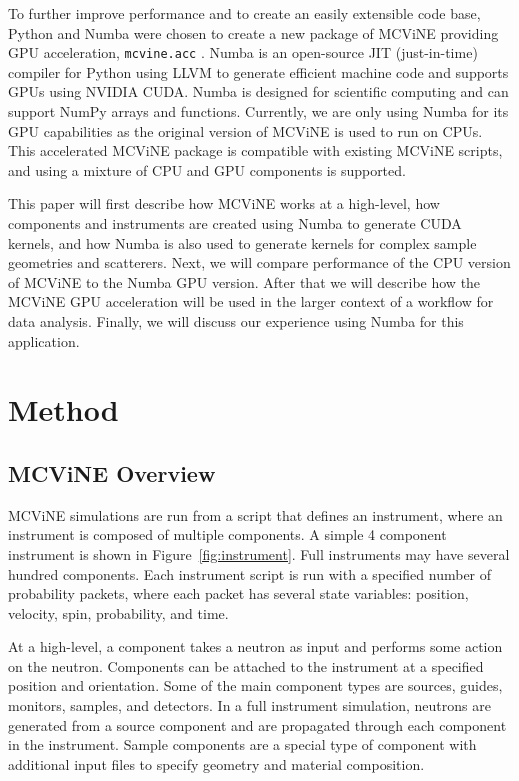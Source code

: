 To further improve performance and to create an easily extensible code base, Python and Numba \cite{lam2015numba} were chosen to create a new package of MCViNE providing GPU acceleration, \texttt{mcvine.acc} \cite{Lin_mcvine_acc}. Numba is an open-source JIT (just-in-time) compiler for Python using LLVM to generate efficient machine code and supports GPUs using NVIDIA CUDA. Numba is designed for scientific computing and can support NumPy arrays and functions. Currently, we are only using Numba for its GPU capabilities as the original version of MCViNE is used to run on CPUs. This accelerated MCViNE package is compatible with existing MCViNE scripts, and using a mixture of CPU and GPU components is supported.

This paper will first describe how MCViNE works at a high-level, how components and instruments are created using Numba to generate CUDA kernels, and how Numba is also used to generate kernels for complex sample geometries and scatterers. 
Next, we will compare performance of the CPU version of MCViNE to the Numba GPU version.
After that we will describe how the MCViNE GPU acceleration will be used in the larger context of a workflow for data analysis. 
Finally, we will discuss our experience using Numba for this application.


\section{Method}

\subsection{MCViNE Overview}

MCViNE simulations are run from a script that defines an instrument, where an instrument is composed of multiple components. A simple 4 component instrument is shown in Figure~\ref{fig:instrument}. Full instruments may have several hundred components. Each instrument script is run with a specified number of probability packets, where each packet has several state variables: position, velocity, spin, probability, and time.

At a high-level, a component takes a neutron as input and performs some action on the neutron. Components can be attached to the instrument at a specified position and orientation. Some of the main component types are sources, guides, monitors, samples, and detectors. In a full instrument simulation, neutrons are generated from a source component and are propagated through each component in the instrument. Sample components are a special type of component with additional input files to specify geometry and material composition.

